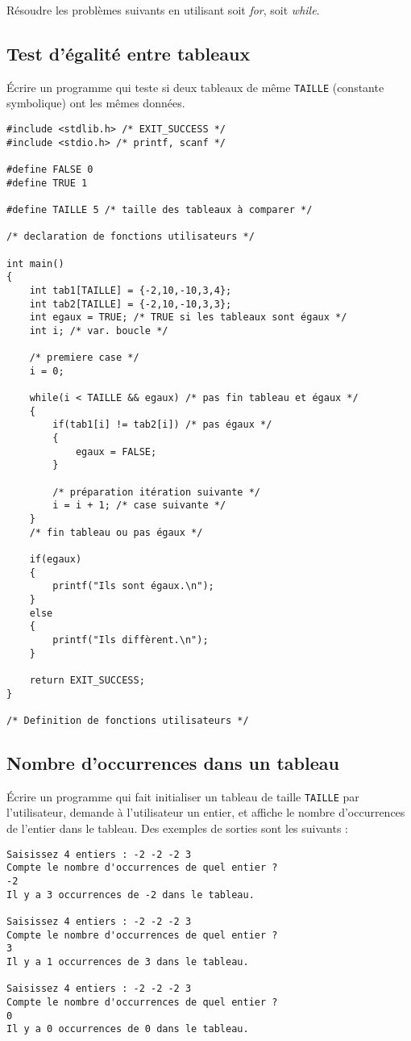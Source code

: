 Résoudre les problèmes suivants en utilisant soit \textit{for}, soit \textit{while}.

\subsection{Test d'égalité entre tableaux}

Écrire un programme qui teste si deux tableaux de même \verb|TAILLE| (constante symbolique) ont les mêmes données.

\begin{correction}
\begin{verbatim}
#include <stdlib.h> /* EXIT_SUCCESS */
#include <stdio.h> /* printf, scanf */

#define FALSE 0
#define TRUE 1

#define TAILLE 5 /* taille des tableaux à comparer */

/* declaration de fonctions utilisateurs */

int main()
{
    int tab1[TAILLE] = {-2,10,-10,3,4};
    int tab2[TAILLE] = {-2,10,-10,3,3};
    int egaux = TRUE; /* TRUE si les tableaux sont égaux */ 
    int i; /* var. boucle */

    /* premiere case */
    i = 0;

    while(i < TAILLE && egaux) /* pas fin tableau et égaux */
    {
        if(tab1[i] != tab2[i]) /* pas égaux */
        {
            egaux = FALSE;
        }

        /* préparation itération suivante */
        i = i + 1; /* case suivante */
    }
    /* fin tableau ou pas égaux */

    if(egaux)
    {
        printf("Ils sont égaux.\n");
    }
    else
    {
        printf("Ils diffèrent.\n");
    }

    return EXIT_SUCCESS;
}

/* Definition de fonctions utilisateurs */

\end{verbatim}
\end{correction}

\subsection{Nombre d'occurrences dans un tableau}

Écrire un programme qui fait initialiser un tableau de taille \verb|TAILLE| par l'utilisateur, demande à l'utilisateur un entier, et affiche le nombre d'occurrences de l'entier dans le tableau. Des exemples de sorties sont les suivants :
\begin{verbatim}
Saisissez 4 entiers : -2 -2 -2 3
Compte le nombre d'occurrences de quel entier ?
-2
Il y a 3 occurrences de -2 dans le tableau.

Saisissez 4 entiers : -2 -2 -2 3
Compte le nombre d'occurrences de quel entier ?
3
Il y a 1 occurrences de 3 dans le tableau.

Saisissez 4 entiers : -2 -2 -2 3
Compte le nombre d'occurrences de quel entier ?
0
Il y a 0 occurrences de 0 dans le tableau.
\end{verbatim}

